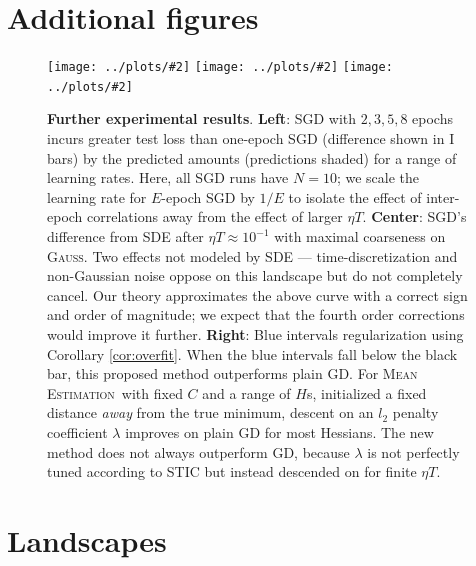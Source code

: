 \documentclass[openany, notitlepage, justified]{tufte-book}
\theoremstyle{plain}
\theoremstyle{definition}
\newcommand{\pmoo}[2]{\texttt{[image: ../plots/\#2]}}
\newcommand{\Gauss}{\textsc{Gauss}}
\newcommand{\MeanEstimation}{\textsc{Mean Estimation}}
\begin{document}
    \section{Additional figures}                                 \label{appendix:marginfigures}
        \begin{figure}
            \centering
            \centering
            \pmoo{3.5cm}{multi-fashion-logistic-0}
            \pmoo{3.5cm}{vs-sde}
            \pmoo{3.5cm}{tak-reg}
            \caption{
                \textbf{Further experimental results}.
                \textbf{Left}: SGD with $2, 3, 5, 8$ epochs incurs greater test
                loss than one-epoch SGD (difference shown in I bars) by the
                predicted amounts (predictions shaded) for a range of learning
                rates.  Here, all SGD runs have $N=10$; we scale the learning
                rate for $E$-epoch SGD by $1/E$ to isolate the effect of
                inter-epoch correlations away from the effect of larger $\eta
                T$.
                \textbf{Center}: SGD's difference from SDE after $\eta T
                \approx 10^{-1}$ with maximal coarseness on \Gauss.  Two
                effects not modeled by SDE --- time-discretization and
                non-Gaussian noise oppose on this landscape but do not
                completely cancel.  Our theory approximates the above curve
                with a correct sign and order of magnitude; we expect that the
                fourth order corrections would improve it further.
                \textbf{Right}: Blue intervals regularization using Corollary
                \ref{cor:overfit}.  When the blue intervals fall below the
                black bar, this proposed method outperforms plain GD.  For
                \MeanEstimation\ with fixed $C$ and a range of $H$s, initialized
                a fixed distance \emph{away} from the true minimum, descent on
                an $l_2$ penalty coefficient $\lambda$ improves on plain GD for
                most Hessians.  The new method does not always outperform GD,
                because $\lambda$ is not perfectly tuned according to STIC but
                instead descended on for finite $\eta T$.
            }
            \label{fig:takreg}
        \end{figure}

    \section{Landscapes}\label{appendix:experiments}
\end{document}
